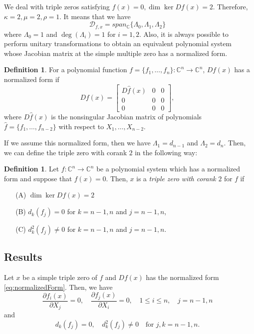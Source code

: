 \documentclass[12pt,oneside,reqno]{amsart}
\theoremstyle{definition}
\newtheorem{defi}[thm]{Definition}
\begin{document}
We deal with triple zeros satisfying $f(x)=0, \dim \ker Df(x)=2$. Therefore, $\kappa=2, \mu=2, \rho =1$.
It means that we have 
\[\mathcal{D}_{f,x}=span_\mathbb{C}\{\Lambda_0,\Lambda_1,\Lambda_2\}\]
where $\Lambda_0=1$ and $\deg(\Lambda_i)=1$ for $i=1,2$. Also, it is always possible to perform unitary transformations to obtain an equivalent polynomial system whose Jacobian matrix at the simple multiple zero has a normalized form.
\begin{defi}
	For a polynomial function $f=\{f_1,\dots, f_n\}:\mathbb{C}^n\rightarrow\mathbb{C}^n$, $Df(x)$ has a normalized form if 
	\[Df(x)=\begin{bmatrix}
	D\hat{f}(x) & 0 & 0\\
	0 & 0 & 0 \\
	0 & 0 & 0
	\end{bmatrix},\label{eq:normalizedForm}\]
	where $D\hat{f}(x)$ is the nonsingular Jacobian matrix of polynomials $\hat{f}=\{f_1,\dots, f_{n-2}\}$ with respect to $X_1,\dots, X_{n-2}$.
\end{defi}


If we assume this normalized form, then we have $\Lambda_1=d_{n-1}$ and $\Lambda_2=d_n$. Then, we can define the triple zero with corank $2$ in the following way:
\begin{defi}
 Let $f:\mathbb{C}^n\rightarrow\mathbb{C}^n$ be a polynomial system which has a normalized form and suppose that $f(x)=0$. Then, $x$ is a {\it triple zero with corank $2$} for $f$ if
 \begin{itemize}
 	\item[(A)] $\dim\ker Df(x)=2$
 	\item[(B)] $d_k(f_j)=0$ for $k=n-1,n$ and $j=n-1,n$,
 	\item[(C)] $d_k^2(f_j)\ne0$ for $k=n-1,n$ and $j=n-1,n$.
 	\end{itemize}
	
\end{defi}


\subsection{Results}
Let $x$ be a simple triple zero of $f$ and $Df(x)$ has the normalized form \ref{eq:normalizedForm}. Then, we have 
\[\frac{\partial f_i(x)}{\partial X_j}=0,\quad \frac{\partial f_j(x)}{\partial X_i}=0, \quad 1\leq i\leq n,\quad j=n-1,n\]
and
\[d_k(f_j)=0,\quad d_k^2(f_j)\ne 0\quad \text{for }j,k=n-1,n.\]
\end{document}

